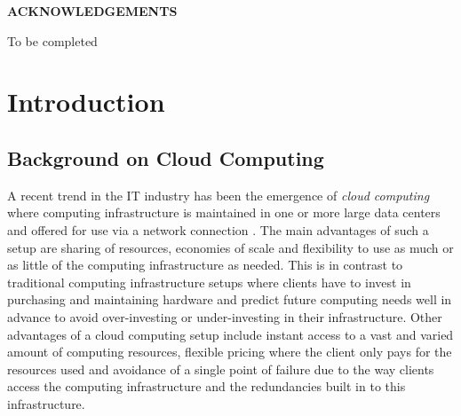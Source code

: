 \documentclass[12pt]{report}
\begin{document}
\setcounter{page}{2}

\newpage

\mbox{}

\newpage
\begin{center} \textbf{\large ACKNOWLEDGEMENTS} \end{center}
\bigskip
\noindent
To be completed

\newpage

\singlespacing

\tableofcontents

\setcounter{tocdepth}{2}

\listoftables

\listoffigures

\newpage
\renewcommand{\nomname}{Notation}
\printnomenclature

\newpage
{}

\chapter{Introduction}

\section{Background on Cloud Computing}

A recent trend in the IT industry has been the emergence of \textit{cloud computing} where computing infrastructure is maintained in one or more large data centers and offered for use via a network connection \cite{Interoute:WhatIsCloudComputing}.
The main advantages of such a setup are sharing of resources, economies of scale and flexibility to use as much or as little of the computing infrastructure as needed.
This is in contrast to traditional computing infrastructure setups where clients have to invest in purchasing and maintaining hardware and predict future computing needs well in advance to avoid over-investing or under-investing in their infrastructure.
Other advantages of a cloud computing setup include instant access to a vast and varied amount of computing resources, flexible pricing where the client only pays for the resources used and avoidance of a single point of failure due to the way clients access the computing infrastructure and the redundancies built in to this infrastructure.
\end{document}

